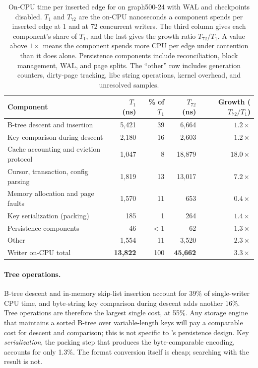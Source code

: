 \begin{table}[h]
  \centering
  \begin{tabularx}{\columnwidth}{@{}Xrrrr@{}}
    \toprule
    Component & $T_1$ (ns) & \% of $T_1$ & $T_{72}$ (ns) & Growth ($T_{72}/T_1$) \\
    \midrule
    B-tree descent and insertion           & 5,421 & 39 & 6,664 & $1.2\times$ \\
    Key comparison during descent          & 2,180 & 16 & 2,603 & $1.2\times$ \\
    Cache accounting and eviction protocol & 1,047 & 8 & 18,879 & $18.0\times$ \\
    Cursor, transaction, config parsing    & 1,819 & 13 & 13,017 & $7.2\times$ \\
    Memory allocation and page faults      & 1,570 & 11 & 653 & $0.4\times$ \\
    Key serialization (packing)            & 185 & 1 & 264 & $1.4\times$ \\
    Persistence components                 & 46 & $<$1 & 62 & $1.3\times$ \\
    Other                                  & 1,554 & 11 & 3,520 & $2.3\times$ \\
    \midrule
    Writer on-CPU total & \textbf{13,822} & 100 & \textbf{45,662} & $\mathbf{3.3\times}$ \\
    \bottomrule
  \end{tabularx}
  \caption{On-CPU time per inserted edge for \project{} on graph500-24 with WAL and
  checkpoints disabled.
  $T_1$ and $T_{72}$ are the on-CPU nanoseconds a component spends per inserted edge at 1
  and at 72 concurrent writers.
  The third column gives each component's share of $T_1$, and the last gives the growth
  ratio $T_{72}/T_1$.
  A value above $1\times$ means the component spends more CPU per edge under contention
  than it does alone.
  Persistence components include reconciliation, block management, WAL, and page splits.
  The ``other'' row includes generation counters, dirty-page tracking, libc string
  operations, kernel overhead, and unresolved samples.}
  \label{tab:wt-overhead}
\end{table}

\paragraph{Tree operations.}
B-tree descent and in-memory skip-list insertion account for 39\% of single-writer CPU time, and byte-string key comparison during descent adds another 16\%.
Tree operations are therefore the largest single cost, at 55\%.
Any storage engine that maintains a sorted B-tree over variable-length keys will pay a comparable cost for descent and comparison; this is not specific to \wt{}'s persistence design.
Key \emph{serialization}, the packing step that produces the byte-comparable encoding, accounts for only 1.3\%.
The format conversion itself is cheap; searching with the result is not.

